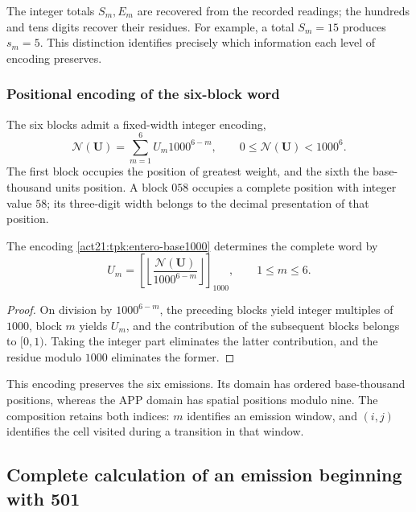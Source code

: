 The integer totals \(S_m,E_m\) are recovered from the recorded readings;
the hundreds and tens digits recover their residues. For example, a total
\(S_m=15\) produces \(s_m=5\). This distinction identifies precisely
which information each level of encoding preserves.



\subsubsection{Positional encoding of the six-block word}

The six blocks admit a fixed-width integer encoding,
\begin{equation}
 \mathscr N(\mathbf U)=\sum_{m=1}^{6}U_m1000^{6-m},
 \qquad0\leq\mathscr N(\mathbf U)<1000^6.
 \label{act21:tpk:entero-base1000}
\end{equation}
The first block occupies the position of greatest weight, and the sixth
the base-thousand units position. A block \(058\) occupies a complete
position with integer value \(58\); its three-digit width belongs to
the decimal presentation of that position.

\begin{proposition}
\label{act21:tpk:inversa-base1000}
The encoding \eqref{act21:tpk:entero-base1000} determines the complete word by
\[
 U_m=\left[\left\lfloor
 \frac{\mathscr N(\mathbf U)}{1000^{6-m}}\right\rfloor\right]_{1000},
 \qquad1\leq m\leq6.
\]
\end{proposition}
\begin{proof}
On division by \(1000^{6-m}\), the preceding blocks yield integer
multiples of \(1000\), block \(m\) yields \(U_m\), and the contribution
of the subsequent blocks belongs to \([0,1)\). Taking the integer part
eliminates the latter contribution, and the residue modulo \(1000\)
eliminates the former.
\end{proof}

This encoding preserves the six emissions. Its domain has ordered
base-thousand positions, whereas the APP domain has spatial positions
modulo nine. The composition retains both indices: \(m\) identifies an
emission window, and \((i,j)\) identifies the cell visited during a
transition in that window.

\subsection{Complete calculation of an emission beginning with 501}
\label{act21:tpk:ejemplo501}

